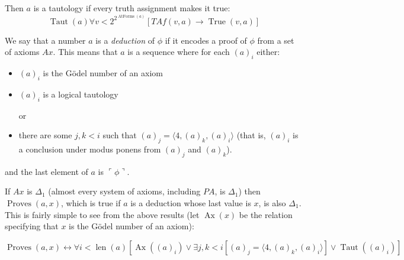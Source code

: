 \documentclass[12pt]{article}
\begin{document}
Then $a$ is a tautology if every truth assignment makes it true:
$$\operatorname{Taut}(a)\forall v<2^{2^{\operatorname{AtForms}(a)}}[TAf(v,a)\rightarrow \operatorname{True}(v,a)]$$

We say that a number $a$ is a \emph{deduction} of $\phi$ if it encodes a proof of $\phi$ from a set of axioms $Ax$.  This means that $a$ is a sequence where for each $(a)_i$ either:

\begin{itemize}
\item $(a)_i$ is the G\"odel number of an axiom

\item $(a)_i$ is a logical tautology

or

\item there are some $j,k<i$ such that $(a)_j=\langle 4,(a)_k,(a)_i\rangle$ (that is, $(a)_i$ is a conclusion under modus ponens from $(a)_j$ and $(a)_k$).
\end{itemize}

and the last element of $a$ is $\ulcorner\phi\urcorner$.

If $Ax$ is $\Delta_1$ (almost every system of axioms, including $PA$, is $\Delta_1$) then $\operatorname{Proves}(a,x)$, which is true if $a$ is a deduction whose last value is $x$, is also $\Delta_1$.  This is fairly simple to see from the above results (let $\operatorname{Ax}(x)$ be the relation specifying that $x$ is the G\"odel number of an axiom):

$$
\operatorname{Proves}(a,x)\leftrightarrow\forall i<\operatorname{len}(a)
\left[\operatorname{Ax}((a)_i)\vee
\exists j,k<i [(a)_j=\langle 4,(a)_k,(a)_i\rangle]\vee
\operatorname{Taut}((a)_i)
\right]$$
\end{document}
